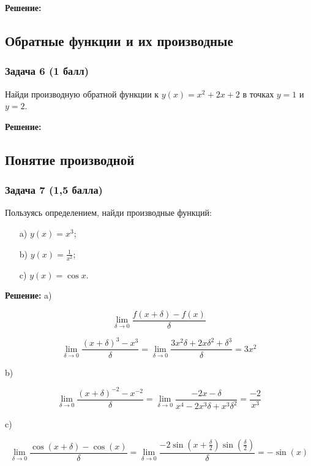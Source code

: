 \documentclass[a4paper,12pt]{article}
\begin{document}
\textbf{Решение:}


\vspace{1cm}

\subsection{Обратные функции и их производные}

\subsubsection{Задача 6 (1 балл)}
Найди производную обратной функции к \( y(x) = x^2 + 2x + 2 \) в точках \( y = 1 \) и \( y = 2 \).

\textbf{Решение:}


\vspace{1cm}

\subsection{Понятие производной}

\subsubsection{Задача 7 (1,5 балла)}
Пользуясь определением, найди производные функций:
\begin{enumerate}
    \item[a)] \( y(x) = x^3 \);
    \item[b)] \( y(x) = \frac{1}{x^2} \);
    \item[c)] \( y(x) = \cos x \).
\end{enumerate}

\textbf{Решение:}
a)

\[
\lim_{\delta \to 0}\frac{f(x + \delta) - f(x)}{\delta}
\]

\[
\lim_{\delta \to 0} \frac{(x+\delta)^3-x^3}{\delta} = \lim_{\delta \to 0} \frac{3x^2\delta + 2x\delta^2+\delta^3}{\delta} = 3x^2
\]

b)

\[
\lim_{\delta \to 0} \frac{(x+\delta)^{-2}-x^{-2}}{
\delta} = \lim_{\delta \to 0} \frac{-2x-\delta}{x^4-2x^3\delta + x^3\delta^2} = \frac{-2}{x^3}
\]

c)

\[
\lim_{\delta \to 0} \frac{\cos(x+\delta) - \cos(x)}{\delta} = \lim_{\delta \to 0} \frac{-2\sin(x+\frac{\delta}{2}) \sin(\frac{\delta}{2})}{\delta} = -\sin(x)
\]
\end{document}
